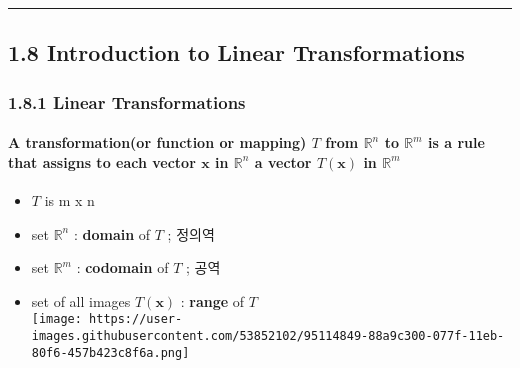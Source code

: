 \documentclass[11pt]{article}
\providecommand{\tightlist}{%
      \setlength{\itemsep}{0pt}\setlength{\parskip}{0pt}}
\begin{document}
    \begin{center}\rule{0.5\linewidth}{\linethickness}\end{center}

\hypertarget{introduction-to-linear-transformations}{%
\subsection{1.8 Introduction to Linear
Transformations}\label{introduction-to-linear-transformations}}

\hypertarget{linear-transformations}{%
\subsubsection{1.8.1 Linear
Transformations}\label{linear-transformations}}

\hypertarget{a-transformationor-function-or-mapping-t-from-mathbbrn-to-mathbbrm-is-a-rule-that-assigns-to-each-vector-mathbfx-in-mathbbrn-a-vector-tmathbfx-in-mathbbrm}{%
\paragraph{\texorpdfstring{A transformation(or function or mapping)
\(T\) from \(\mathbb{R}^n\) to \(\mathbb{R}^m\) is a rule that assigns
to each vector \(\mathbf{x}\) in \(\mathbb{R}^n\) a vector
\(T(\mathbf{x})\) in
\(\mathbb{R}^m\)}{A transformation(or function or mapping) T from \textbackslash{}mathbb\{R\}\^{}n to \textbackslash{}mathbb\{R\}\^{}m is a rule that assigns to each vector \textbackslash{}mathbf\{x\} in \textbackslash{}mathbb\{R\}\^{}n a vector T(\textbackslash{}mathbf\{x\}) in \textbackslash{}mathbb\{R\}\^{}m}}\label{a-transformationor-function-or-mapping-t-from-mathbbrn-to-mathbbrm-is-a-rule-that-assigns-to-each-vector-mathbfx-in-mathbbrn-a-vector-tmathbfx-in-mathbbrm}}

\begin{itemize}
\tightlist
\item
  \(T\) is m x n
\item
  set \(\mathbb{R}^n\) : \textbf{domain} of \(T\) ; 정의역
\item
  set \(\mathbb{R}^m\) : \textbf{codomain} of \(T\) ; 공역
\item
  set of all images \(T(\mathbf{x})\) : \textbf{range} of \(T\)\\
  \texttt{[image: https://user-images.githubusercontent.com/53852102/95114849-88a9c300-077f-11eb-80f6-457b423c8f6a.png]}
\end{itemize}
\end{document}
